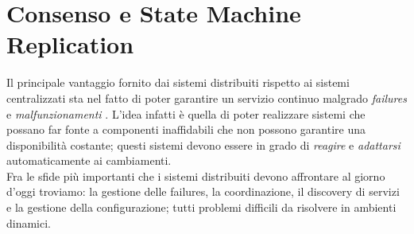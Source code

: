 \chapter{Consenso e State Machine Replication}
Il principale vantaggio fornito dai sistemi distribuiti rispetto ai sistemi centralizzati sta nel fatto di poter garantire un servizio continuo malgrado \textit{failures} e \textit{malfunzionamenti} \cite[Friedman:1996]{Friedman:1996}.
L'idea infatti è quella di poter realizzare sistemi che possano far fonte a componenti inaffidabili che non possono garantire una disponibilità costante; questi sistemi devono essere in grado di \textit{reagire} e \textit{adattarsi} automaticamente ai cambiamenti.\\
Fra le sfide più importanti che i sistemi distribuiti devono affrontare al giorno d'oggi troviamo: la gestione delle failures, la coordinazione, il discovery di servizi e la gestione della configurazione; tutti problemi difficili da risolvere in ambienti dinamici.
